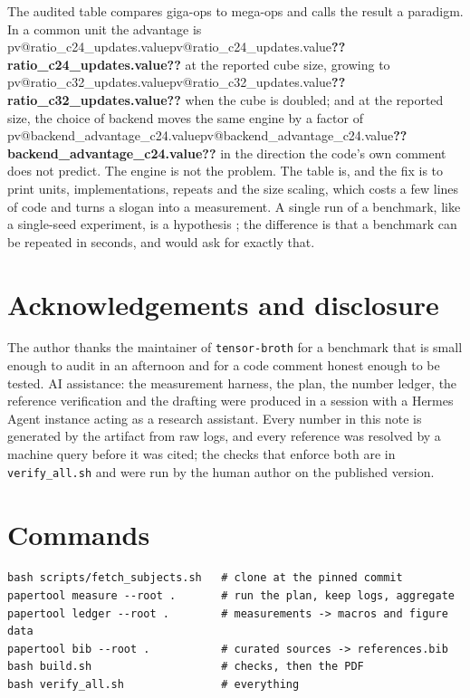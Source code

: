\documentclass[11pt,a4paper]{article}
\makeatletter
\newcommand{\val}[1]{\ifcsname pv@#1\endcsname\csname pv@#1\endcsname\else\textbf{??#1??}\fi}
\makeatother
\begin{document}
The audited table compares giga-ops to mega-ops and calls the result a paradigm. In a common unit
the advantage is \val{ratio_c24_updates.value} at the reported cube size, growing to
\val{ratio_c32_updates.value} when the cube is doubled; and at the reported size, the choice of
backend moves the same engine by a factor of \val{backend_advantage_c24.value} in the direction the
code's own comment does not predict. The engine is not the problem. The table is, and the fix is to
print units, implementations, repeats and the size scaling, which costs a few lines of code and
turns a slogan into a measurement. A single run of a benchmark, like a single-seed experiment,
is a hypothesis \citep{ioannidis2005}; the difference is that a benchmark can be repeated in
seconds, and \citet{sandve2013} would ask for exactly that.

\section*{Acknowledgements and disclosure}

The author thanks the maintainer of \texttt{tensor-broth} for a benchmark that is small enough to
audit in an afternoon and for a code comment honest enough to be tested. AI assistance: the
measurement harness, the plan, the number ledger, the reference verification and the drafting were
produced in a session with a Hermes Agent instance acting as a research assistant. Every number in
this note is generated by the artifact from raw logs, and every reference was resolved by a machine
query before it was cited; the checks that enforce both are in \texttt{verify\_all.sh} and were run
by the human author on the published version.




\appendix
\section{Commands}

\begin{verbatim}
bash scripts/fetch_subjects.sh   # clone at the pinned commit
papertool measure --root .       # run the plan, keep logs, aggregate
papertool ledger --root .        # measurements -> macros and figure data
papertool bib --root .           # curated sources -> references.bib
bash build.sh                    # checks, then the PDF
bash verify_all.sh               # everything
\end{verbatim}
\end{document}
